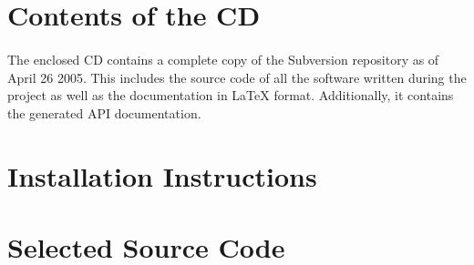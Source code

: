 \appendix
\appendixpage
\addappheadtotoc


\section{Contents of the CD}
\paragraph{}
The enclosed CD contains a complete copy of the Subversion repository as of April 26 2005. This includes the source code of all the software written during the project as well as the documentation in \LaTeX{} format. Additionally, it contains the generated API documentation.

\section{Installation Instructions}
\subsection{}


\section{Selected Source Code}
